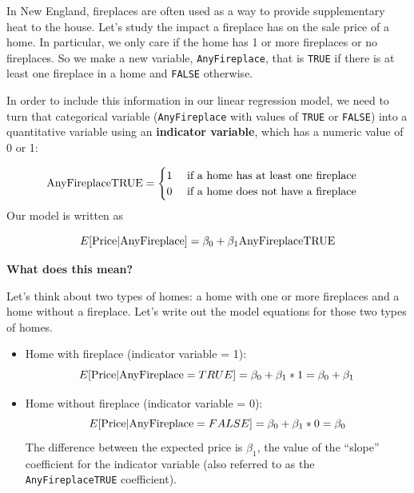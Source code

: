 \documentclass[
]{book}
\newenvironment{Shaded}{\begin{snugshade}}{\end{snugshade}}
\newcommand{\DataTypeTok}[1]{\textcolor[rgb]{0.13,0.29,0.53}{#1}}
\newcommand{\DecValTok}[1]{\textcolor[rgb]{0.00,0.00,0.81}{#1}}
\newcommand{\KeywordTok}[1]{\textcolor[rgb]{0.13,0.29,0.53}{\textbf{#1}}}
\newcommand{\NormalTok}[1]{#1}
\newcommand{\OperatorTok}[1]{\textcolor[rgb]{0.81,0.36,0.00}{\textbf{#1}}}
\newcommand{\StringTok}[1]{\textcolor[rgb]{0.31,0.60,0.02}{#1}}
\begin{document}
In New England, fireplaces are often used as a way to provide supplementary heat to the house. Let's study the impact a fireplace has on the sale price of a home. In particular, we only care if the home has 1 or more fireplaces or no fireplaces. So we make a new variable, \texttt{AnyFireplace}, that is \texttt{TRUE} if there is at least one fireplace in a home and \texttt{FALSE} otherwise.

\begin{Shaded}
\end{Shaded}

In order to include this information in our linear regression model, we need to turn that categorical variable (\texttt{AnyFireplace} with values of \texttt{TRUE} or \texttt{FALSE}) into a quantitative variable using an \textbf{indicator variable}, which has a numeric value of 0 or 1:

\[ \hbox{AnyFireplaceTRUE} = \begin{cases}1 \quad \text{ if a home has at least one fireplace}\\ 0\quad \text{ if a home does not have a fireplace} \end{cases}\]
Our model is written as

\[E[\hbox{Price} | \hbox{AnyFireplace}] = \beta_0 + \beta_1 \hbox{AnyFireplaceTRUE}\]

\textbf{What does this mean?}

Let's think about two types of homes: a home with one or more fireplaces and a home without a fireplace. Let's write out the model equations for those two types of homes.

\begin{itemize}
\item
  Home with fireplace (indicator variable = 1):\\
  \[E[\hbox{Price} | \hbox{AnyFireplace} = TRUE] = \beta_0 + \beta_1*1 = \beta_0+\beta_1\]
\item
  Home without fireplace (indicator variable = 0):\\
  \[E[\hbox{Price} | \hbox{AnyFireplace} = FALSE] = \beta_0 + \beta_1*0 = \beta_0\]
  The difference between the expected price is \(\beta_1\), the value of the ``slope'' coefficient for the indicator variable (also referred to as the \texttt{AnyFireplaceTRUE} coefficient).
\end{itemize}
\end{document}
